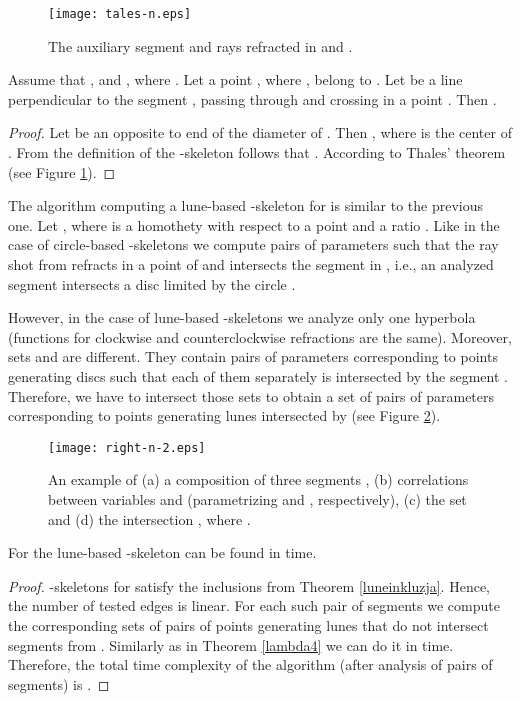 \documentclass[11pt]{llncs}
\begin{document}
\begin{figure}[htbp]
\centering
\texttt{[image: tales-n.eps]}
\caption{ The auxiliary segment  and rays refracted in  and . 
}
\label{fig:tales}
\end{figure}

\begin{lemma}
 Assume that ,  and ,
where . Let a point , where , 
belong to . 
Let  be a line perpendicular to the segment , passing
through  and crossing  in a point . Then 
.
    
\end{lemma}
\begin{proof} 
 Let  be an opposite to  end of the diameter of .    
Then , where  is the center of .
From the definition of the -skeleton follows that 
.
According to Thales' theorem  (see Figure \ref{fig:tales}). 

\end{proof}






 The algorithm computing a lune-based -skeleton for  is similar 
to the previous one. Let , where
 is a homothety with respect to a point  
and a ratio .
Like in the case of circle-based -skeletons we compute pairs of parameters  
such that the ray shot from  refracts in a point of  and intersects the segment
 in , i.e., an analyzed segment  intersects a disc limited by the circle 
. 

However, in the case of lune-based -skeletons we analyze only one hyperbola 
(functions for clockwise and counterclockwise refractions are the same). 
Moreover, sets  and  are different. 
 They contain pairs of parameters  corresponding to points generating discs 
such that each of them separately is intersected by the segment .
Therefore, we have to intersect those sets to obtain a set of pairs of parameters
corresponding to points generating lunes intersected by  (see Figure \ref{fig:right}). 



\begin{figure}[htbp]
\centering
\texttt{[image: right-n-2.eps]}
\caption{An example of (a) a composition of three segments , (b) correlations 
between variables  and  (parametrizing  and , respectively), 
(c) the set  and (d) the intersection ,
where . }
\label{fig:right}
\end{figure}

\begin{theorem}
For  the lune-based -skeleton  can be found 
in  time.
\end{theorem} 
\begin{proof}
-skeletons for  satisfy the inclusions from Theorem \ref{luneinkluzja}.
Hence, the number of tested edges is linear. For each such pair of segments  
we compute the corresponding sets of pairs of points generating lunes that do not intersect 
segments from . 
Similarly as in Theorem \ref{lambda4} we can do it in  time.
Therefore, the total time complexity of the algorithm (after analysis of  pairs 
of segments) is .   
\end{proof}
\end{document}
